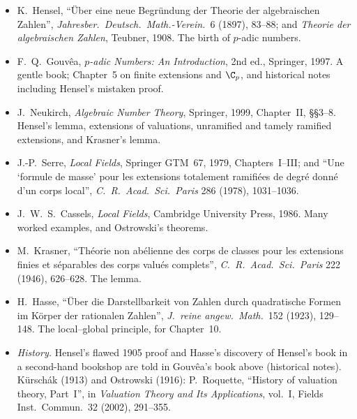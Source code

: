 \begin{itemize}
\item K.~Hensel, ``\"Uber eine neue Begr\"undung der Theorie der algebraischen Zahlen'', \emph{Jahresber.\ Deutsch.\ Math.-Verein.}\
6 (1897), 83--88; and \emph{Theorie der algebraischen Zahlen}, Teubner, 1908. The birth of $p$-adic numbers.
\item F.~Q.~Gouv\^ea, \emph{$p$-adic Numbers: An Introduction}, 2nd ed., Springer, 1997. A gentle book; Chapter~5 on finite
extensions and $\C_p$, and historical notes including Hensel's mistaken proof.
\item J.~Neukirch, \emph{Algebraic Number Theory}, Springer, 1999, Chapter~II, \S\S3--8. Hensel's lemma, extensions of
valuations, unramified and tamely ramified extensions, and Krasner's lemma.
\item J.-P.~Serre, \emph{Local Fields}, Springer GTM~67, 1979, Chapters~I--III; and ``Une `formule de masse' pour les extensions
totalement ramifi\'ees de degr\'e donn\'e d'un corps local'', \emph{C.\ R.\ Acad.\ Sci.\ Paris} 286 (1978), 1031--1036.
\item J.~W.~S.~Cassels, \emph{Local Fields}, Cambridge University Press, 1986. Many worked examples, and Ostrowski's theorems.
\item M.~Krasner, ``Th\'eorie non ab\'elienne des corps de classes pour les extensions finies et s\'eparables des corps valu\'es
complets'', \emph{C.\ R.\ Acad.\ Sci.\ Paris} 222 (1946), 626--628. The lemma.
\item H.~Hasse, ``\"Uber die Darstellbarkeit von Zahlen durch quadratische Formen im K\"orper der rationalen Zahlen'', \emph{J.\
reine angew.\ Math.}\ 152 (1923), 129--148. The local--global principle, for Chapter~10.
\item \emph{History.} Hensel's flawed 1905 proof and Hasse's discovery of Hensel's book in a second-hand bookshop are told in
Gouv\^ea's book above (historical notes). K\"ursch\'ak (1913) and Ostrowski (1916): P.~Roquette, ``History of valuation
theory, Part~I'', in \emph{Valuation Theory and Its Applications}, vol.~I, Fields Inst.\ Commun.\ 32 (2002), 291--355.
\end{itemize}
